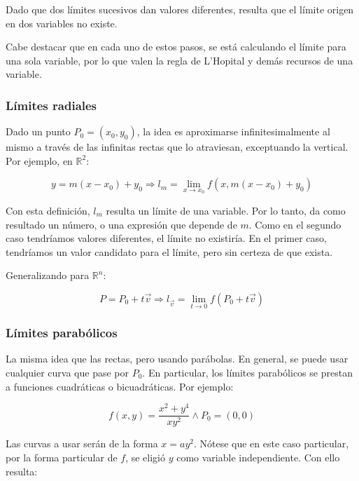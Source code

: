 \documentclass{article}
\renewcommand{\Bbb}{\mathbb}
\begin{document}
Dado que dos límites sucesivos dan valores diferentes, resulta que el límite origen en dos variables no existe.

Cabe destacar que en cada uno de estos pasos, se está calculando el límite para una sola variable, por lo que valen la regla de L'Hopital y demás recursos de una variable.

\subsubsection{Límites radiales}

Dado un punto $P_0 = (x_0, y_0)$, la idea es aproximarse infinitesimalmente al mismo a través de las infinitas rectas que lo atraviesan, exceptuando la vertical. Por ejemplo, en $\Bbb R^2$:

\begin{equation}
y = m (x-x_0) + y_0 \Rightarrow l_m = \lim_{x \rightarrow x_0} f(x, m (x-x_0) + y_0)
\end{equation}

Con esta definición, $l_m$ resulta un límite de una variable. Por lo tanto, da como resultado un número, o una expresión que depende de $m$. Como en el segundo caso tendríamos valores diferentes, el límite no existiría. En el primer caso, tendríamos un valor candidato para el límite, pero sin certeza de que exista.

Generalizando para $\Bbb R^n$:

\begin{equation}
P = P_0 + t \overrightarrow{v} \Rightarrow l_{\overrightarrow{v}} = \lim_{t \rightarrow 0} f(P_0 + t \overrightarrow{v})
\end{equation}

\subsubsection{Límites parabólicos}

La misma idea que las rectas, pero usando parábolas. En general, se puede usar cualquier curva que pase por $P_0$. En particular, los límites parabólicos se prestan a funciones cuadráticas o bicuadráticas. Por ejemplo:

\begin{equation}
f(x,y) = \frac{x^2 + y^4}{xy^2} \wedge P_0 = (0,0)
\end{equation}

Las curvas a usar serán de la forma $x = a y^2$. Nótese que en este caso particular, por la forma particular de $f$, se eligió $y$ como variable independiente. Con ello resulta:
\end{document}
